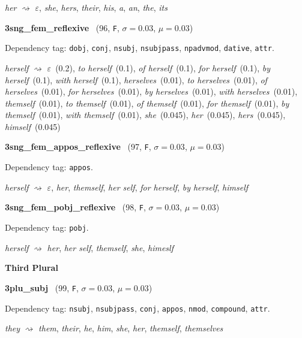 \documentclass[11pt]{article}
\newenvironment{desc}{%
	\list{}{%
		\parsep 0.25em
		\topsep 0.25em
		\leftmargin 1em
		\rightmargin 0em
	}
	\item\relax
	\sloppy
}{%
	\endlist
}
\newcommand{\attr}[4]{%
	(#1, \texttt{#2}, $\sigma=#3$, $\mu=#4$)
}
\begin{document}
\begin{desc}
	\textit{her}
	$\rightsquigarrow$
	\textit{$\varepsilon$},
	\textit{she},
	\textit{hers},
	\textit{their},
	\textit{his},
	\textit{a},
	\textit{an},
	\textit{the},
	\textit{its}
\end{desc}

\noindent
\textbf{3sng\_fem\_reflexive}~\attr{96}{F}{0.03}{0.03}

\begin{desc}
	Dependency tag:
	\texttt{dobj},
	\texttt{conj},
	\texttt{nsubj},
	\texttt{nsubjpass},
	\texttt{npadvmod},
	\texttt{dative},
	\texttt{attr}.

	\textit{herself}
	$\rightsquigarrow$
	\textit{$\varepsilon$}~(0.2),
	\textit{to herself}~(0.1),
	\textit{of herself}~(0.1),
	\textit{for herself}~(0.1),
	\textit{by herself}~(0.1),
	\textit{with herself}~(0.1),
	\textit{herselves}~(0.01),
	\textit{to herselves}~(0.01),
	\textit{of herselves}~(0.01),
	\textit{for herselves}~(0.01),
	\textit{by herselves}~(0.01),
	\textit{with herselves}~(0.01),
	\textit{themself}~(0.01),
	\textit{to themself}~(0.01),
	\textit{of themself}~(0.01),
	\textit{for themself}~(0.01),
	\textit{by themself}~(0.01),
	\textit{with themself}~(0.01),
	\textit{she}~(0.045),
	\textit{her}~(0.045),
	\textit{hers}~(0.045),
	\textit{himself}~(0.045)
\end{desc}

\noindent
\textbf{3sng\_fem\_appos\_reflexive}~\attr{97}{F}{0.03}{0.03}

\begin{desc}
	Dependency tag: \texttt{appos}.

	\textit{herself}
	$\rightsquigarrow$
	\textit{$\varepsilon$},
	\textit{her},
	\textit{themself},
	\textit{her self},
	\textit{for herself},
	\textit{by herself},
	\textit{himself}
\end{desc}

\noindent
\textbf{3sng\_fem\_pobj\_reflexive}~\attr{98}{F}{0.03}{0.03}

\begin{desc}
	Dependency tag: \texttt{pobj}.

	\textit{herself}
	$\rightsquigarrow$
	\textit{her},
	\textit{her self},
	\textit{themself},
	\textit{she},
	\textit{himeslf}
\end{desc}

\noindent
\textbf{Third Plural}

\noindent
\textbf{3plu\_subj}~\attr{99}{F}{0.03}{0.03}

\begin{desc}
	Dependency tag:
	\texttt{nsubj},
	\texttt{nsubjpass},
	\texttt{conj},
	\texttt{appos},
	\texttt{nmod},
	\texttt{compound},
	\texttt{attr}.

	\textit{they}
	$\rightsquigarrow$
	\textit{them},
	\textit{their},
	\textit{he},
	\textit{him},
	\textit{she},
	\textit{her},
	\textit{themself},
	\textit{themselves}
\end{desc}
\end{document}

